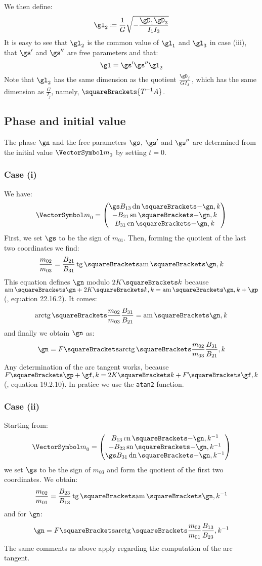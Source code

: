 \documentclass[10pt, a4paper, twoside]{basestyle}
\begin{document}
We then define:
\[
\gl_2 \DefineAs \frac{1}{G} \sqrt{-\frac{\gD_1 \gD_3}{I_1 I_3}}
\]
It is easy to see that $\gl_2$ is the common value of $\gl_1$ and $\gl_3$ in case (iii), that $\gs'$ and $\gs''$ are free parameters and that:
\[
\gl = \gs' \gs'' \gl_2
\]
Note that $\gl_2$ has the same dimension as the quotient $\frac{\gD_j}{G I_j}$, which has the same dimension as $\frac{G}{I_j}$, namely, $\squareBrackets{T^{-1} A}$.

\subsection*{Phase and initial value}
The phase $\gn$ and the free parameters $\gs$, $\gs'$ and $\gs''$ are determined from the initial value ${\vm}_0$ by setting $t = 0$.
\subsubsection*{Case (i)}
We have:
\[
{\vm}_0 =
\begin{pmatrix}
\gs B_{13} \JacobiDN\of{-\gn, k} \\
-B_{21} \JacobiSN\of{-\gn, k} \\
B_{31} \JacobiCN\of{-\gn, k}
\end{pmatrix}
\]
First, we set $\gs$ to be the sign of $m_{01}$.  Then, forming the quotient of the last two coordinates we find:
\[
\frac{m_{02}}{m_{03}} = \frac{B_{21}}{B_{31}}\TrigonometricTangent\of{\JacobiAmplitude\of{\gn, k}}
\]
This equation defines $\gn$ modulo $2 K\of{k}$ because $\JacobiAmplitude\of{\gn + 2 K\of{k}, k} = \JacobiAmplitude\of{\gn, k} + \gp$  (\cite{NistHMF2010}, equation 22.16.2).  It comes:
\[
\InverseTrigonometricTangent\of{\frac{m_{02}}{m_{03}} \frac{B_{31}}{B_{21}}} = \JacobiAmplitude\of{\gn, k}
\]
and finally we obtain $\gn$ as:
\[
\gn = F\of{\InverseTrigonometricTangent\of{\frac{m_{02}}{m_{03}} \frac{B_{31}}{B_{21}}}, k}
\]
Any determination of the arc tangent works, because $F\of{\gp + \gf, k} = 2 K\of{k} + F\of{\gf, k}$ (\cite{NistHMF2010}, equation 19.2.10).  In pratice we use the \texttt{atan2} function.

\subsubsection*{Case (ii)}
Starting from:
\[
{\vm}_0 =
\begin{pmatrix}
B_{13} \JacobiCN\of{-\gn, k^{-1}} \\
-B_{23} \JacobiSN\of{-\gn, k^{-1}} \\
\gs B_{31} \JacobiDN\of{-\gn, k^{-1}}
\end{pmatrix}
\]
we set $\gs$ to be the sign of $m_{03}$ and form the quotient of the first two coordinates.  We obtain:
\[
\frac{m_{02}}{m_{01}} = \frac{B_{23}}{B_{13}} \TrigonometricTangent\of{\JacobiAmplitude\of{\gn, k^{-1}}} 
\]
and for $\gn$:
\[
\gn = F\of{\InverseTrigonometricTangent\of{\frac{m_{02}}{m_{01}} \frac{B_{13}}{B_{23}}}, k^{-1}}
\]
The same comments as above apply regarding the computation of the arc tangent.
\end{document}
